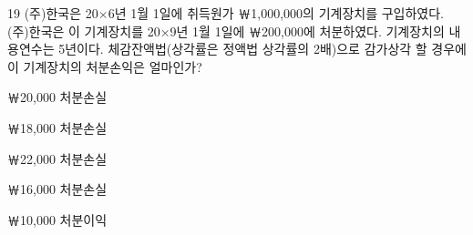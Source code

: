 \begin{question}{19}
(주)한국은 20×6년 1월 1일에 취득원가 ￦1,000,000의 기계장치를 구입하였다. (주)한국은 이 기계장치를 20×9년 1월 1일에 ￦200,000에 처분하였다. 기계장치의 내용연수는 5년이다. 체감잔액법(상각률은 정액법 상각률의 2배)으로 감가상각 할 경우에 이 기계장치의 처분손익은 얼마인가?
\begin{choices}
  \item ￦20,000 처분손실
  \item ￦18,000 처분손실
  \item ￦22,000 처분손실
  \item ￦16,000 처분손실
  \item ￦10,000 처분이익
\end{choices}
\end{question}
